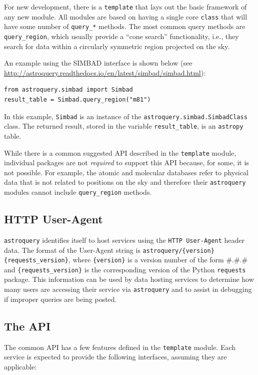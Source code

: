 \documentclass[twocolumn]{aastex61}
\newcommand{\package}[1]{\texttt{#1}\xspace}
\newcommand{\astroquery}{\package{astroquery}}
\newcommand{\astropypkg}{\package{astropy}}
\begin{document}
For new development, there is a \texttt{template}  that lays out the basic
framework of any new module.  All modules are based on having a single core
\texttt{class} that will have some number of \texttt{query\_*} methods.
The most common query methods are \texttt{query\_region}, which usually provide
a ``cone search'' functionality, i.e., they search for data within a circularly
symmetric region projected on the sky.

An example using the SIMBAD interface is shown below (see
\url{http://astroquery.readthedocs.io/en/latest/simbad/simbad.html}):
\begin{lstlisting}[caption=Query SIMBAD for a region around M81]
from astroquery.simbad import Simbad
result_table = Simbad.query_region("m81")
\end{lstlisting}
In this example, \texttt{Simbad} is an instance of the
\texttt{astroquery.simbad.SimbadClass} class.
The returned result, stored in the variable \texttt{result\_table},
is an \astropypkg table.

While there is a common suggested API described in the \texttt{template} module,
individual packages are not \emph{required} to support this API because, for
some, it is not possible.  For example, the atomic and molecular databases refer
to physical data that is not related to positions on the sky and therefore
their \astroquery modules cannot include \texttt{query\_region} methods.

\subsection{HTTP User-Agent}
\astroquery identifies itself to host services using the \texttt{HTTP
User-Agent} header data.  The format of the User-Agent string is
\texttt{astroquery/\{version\} \{requests\_version\}}, where
\texttt{\{version\}} is a version number of the form \#.\#.\# and
\texttt{\{requests\_version\}} is the corresponding version of the Python
\package{requests} package.  This information can be used by data hosting services
to determine how many users are accessing their service via \astroquery
and to assist in debugging if improper queries are being posted.

\subsection{The API}
The common API has a few features defined in the \texttt{template} module.
Each service is expected to provide the following interfaces, assuming they are
applicable:
\end{document}
